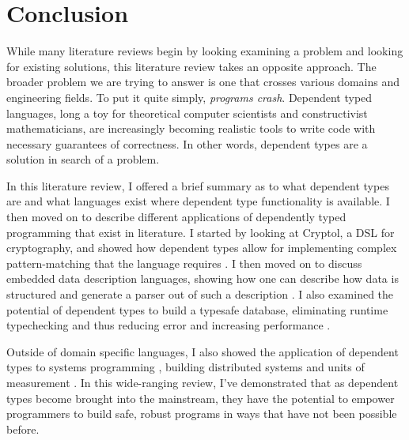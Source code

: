 \section{Conclusion}
While many literature reviews begin by looking examining a problem and looking
for existing solutions, this literature review takes an opposite approach. The
broader problem we are trying to answer is one that crosses various domains and
engineering fields. To put it quite simply, \textit{programs crash}. Dependent
typed languages, long a toy for theoretical computer scientists and
constructivist mathematicians, are increasingly becoming realistic tools to
write code with necessary guarantees of correctness. In other words, dependent
types are a solution in search of a problem. 

In this literature review, I offered a brief summary as to what dependent types
are and what languages exist where dependent type functionality is available. I
then moved on to describe different applications of dependently typed
programming that exist in literature. I started by looking at Cryptol, a DSL for
cryptography, and showed how dependent types allow for implementing complex
pattern-matching that the language requires \cite{power_of_pi}. I then moved on
to discuss embedded data description languages, showing how one can describe how
data is structured and generate a parser out of such a description
\cite{power_of_pi}. I also examined the potential of dependent types to build a
typesafe database, eliminating runtime typechecking and thus reducing error and
increasing performance \cite{power_of_pi, eisenberg2016}. 

Outside of domain specific languages, I also showed the application of dependent
types to systems programming \cite{idris_systems_programming}, building
distributed systems \cite{fstar_distributed_programming} and units of
measurement \cite{gundry2013}. In this wide-ranging review, I've demonstrated
that as dependent types become brought into the mainstream, they have the
potential to empower programmers to build safe, robust programs in ways that
have not been possible before. 